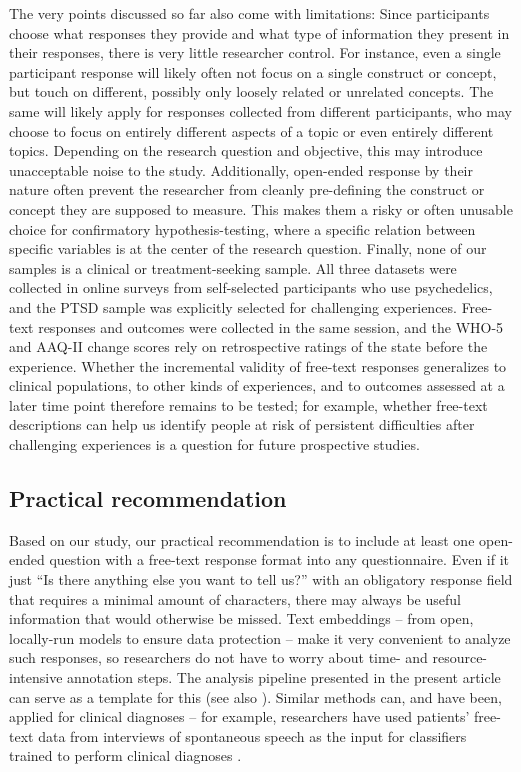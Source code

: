 \documentclass[man,floatsintext]{apa7}
\newcommand{\change}[1]{#1}
\begin{document}
\change{The very points discussed so far also come with limitations:} Since participants choose what responses they provide and what type of information they present in their responses, there is very little researcher control. For instance, even a single participant response will likely often not focus on a single construct or concept, but touch on different, possibly only loosely related or unrelated concepts. The same will likely apply for responses collected from different participants, who may choose to focus on entirely different aspects of a topic or even entirely different topics. Depending on the research question and objective, this may introduce unacceptable noise to the study. Additionally, open-ended response by their nature often prevent the researcher from cleanly pre-defining the construct or concept they are supposed to measure. This makes them a risky or often unusable choice for confirmatory hypothesis-testing, where a specific relation between specific variables is at the center of the research question.  \change{Finally, none of our samples is a clinical or treatment-seeking sample. All three datasets were collected in online surveys from self-selected participants who use psychedelics, and the PTSD sample was explicitly selected for challenging experiences. Free-text responses and outcomes were collected in the same session, and the WHO-5 and AAQ-II change scores rely on retrospective ratings of the state before the experience. Whether the incremental validity of free-text responses generalizes to clinical populations, to other kinds of experiences, and to outcomes assessed at a later time point therefore remains to be tested; for example, whether free-text descriptions can help us identify people at risk of persistent difficulties after challenging experiences is a question for future prospective studies.}


\subsection{Practical recommendation}

Based on our study, our practical recommendation is to include at least one open-ended question with a free-text response format into any questionnaire. Even if it just ``Is there anything else you want to tell us?'' with an obligatory response field that requires a minimal amount of characters, there may always be useful information that would otherwise be missed. Text embeddings -- from open, locally-run models to ensure data protection -- make it very convenient to analyze such responses, so researchers do not have to worry about time- and resource-intensive annotation steps. The analysis pipeline presented in the present article can serve as a template for this (see also \cite{kjell2023text,debelak2025embeddings}). \change{Similar methods can, and have been, applied for clinical diagnoses -- for example, researchers have used patients' free-text data from interviews of spontaneous speech as the input for classifiers trained to perform clinical diagnoses \parencite{agbavor2022predicting,chen2025detecting,chen2026depression}. }
\end{document}
